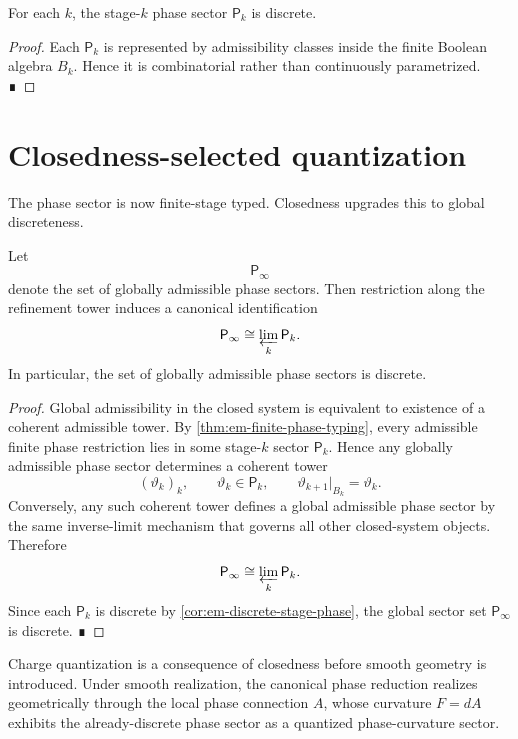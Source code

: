 \begin{corollary}
	\label{cor:em-discrete-stage-phase}
	For each \(k\), the stage-\(k\) phase sector \(\mathsf P_k\) is
	discrete.
\end{corollary}
\begin{proof}
	Each \(\mathsf P_k\) is represented by admissibility classes inside the
	finite Boolean algebra \(B_k\).
	Hence it is combinatorial rather than continuously parametrized. ∎
\end{proof}
\section{Closedness-selected quantization}
\label{sec:em-closedness-quantization}
The phase sector is now finite-stage typed.
Closedness upgrades this to global discreteness.
\begin{theorem}
	\label{thm:em-closedness-phase}
	Let
	\[
		\mathsf P_\infty
	\]
	denote the set of globally admissible phase sectors.
	Then restriction along the refinement tower induces a canonical
	identification
	\[
		\mathsf P_\infty \cong \varprojlim_k \mathsf P_k.
	\]
	In particular, the set of globally admissible phase sectors is
	discrete.
\end{theorem}
\begin{proof}
	Global admissibility in the closed system is equivalent to existence of
	a coherent admissible tower.
	By \cref{thm:em-finite-phase-typing}, every admissible finite phase
	restriction lies in some stage-\(k\) sector \(\mathsf P_k\).
	Hence any globally admissible phase sector determines a coherent tower
	\[
		(\vartheta_k)_k,
		\qquad
		\vartheta_k\in\mathsf P_k,
		\qquad
		\vartheta_{k+1}|_{B_k}=\vartheta_k.
	\]
	Conversely, any such coherent tower defines a global admissible phase
	sector by the same inverse-limit mechanism that governs all other
	closed-system objects.
	Therefore
	\[
		\mathsf P_\infty \cong \varprojlim_k \mathsf P_k.
	\]
	Since each \(\mathsf P_k\) is discrete by
	\cref{cor:em-discrete-stage-phase}, the global sector set
	\(\mathsf P_\infty\) is discrete. ∎
\end{proof}
\begin{corollary}
	Charge quantization is a consequence of closedness before smooth
	geometry is introduced.
	Under smooth realization, the canonical phase reduction realizes
	geometrically through the local phase connection \(A\), whose
	curvature \(F=dA\) exhibits the already-discrete phase sector as a
	quantized phase-curvature sector.
\end{corollary}
